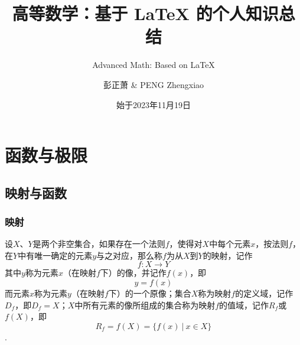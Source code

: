 \documentclass[lang=cn,10pt]{elegantbook}
\title{高等数学：基于 \LaTeX{} 的个人知识总结}
\subtitle{Advanced Math: Based on \LaTeX{}}
\author{彭正萧 \& PENG Zhengxiao}
\institute{西北农林科技大学}
\date{始于2023年11月19日}
\begin{document}
\maketitle
\frontmatter
\tableofcontents
\mainmatter



\chapter{函数与极限}

\section{映射与函数}

\subsection{映射}

\begin{definition}
	设\(X\)、\( Y \)是两个非空集合，如果存在一个法则\( f \)，使得对\( X \)中每个元素\( x \)，按法则\( f \)，在\( Y \)中有唯一确定的元素\( y \)与之对应，那么称\( f \)为从\( X \)到\( Y \)的映射，记作
	\[ f:X \rightarrow Y \]
	其中\( y \)称为元素\( x \)（在映射\( f \)下）的像，并记作\( f(x) \)，即
	\[ y = f(x) \]
	而元素\( x \)称为元素\( y \)（在映射\( f \)下）的一个原像；集合\( X \)称为映射\( f \)的定义域，记作\( D_{f} \)，即\( D_{f} = X \)；\( X \)中所有元素的像所组成的集合称为映射\( f \)的值域，记作\( R_{f} \)或\( f(X) \)，即
	\[ R_{f} = f(X) = \{ f(x)\ |\ x \in X\}\].
\end{definition}
\end{document}
